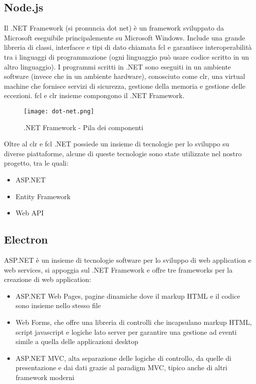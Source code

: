 
\subsection{Node.js}

Il .NET Framework (si pronuncia dot net) è un framework sviluppato da Microsoft eseguibile principalemente su Microsoft Windows.
Include una grande libreria di classi, interfacce e tipi di dato chiamata \Gls{fcl} e garantisce interoperabilità tra i linguaggi di programmazione (ogni linguaggio può usare codice scritto in un altro linguaggio).
I programmi scritti in .NET sono eseguiti in un ambiente software (invece che in un ambiente hardware), conosciuto come \Gls{clr}, una virtual machine che fornisce servizi di sicurezza, gestione della memoria e gestione delle eccezioni.
\Gls{fcl} e \Gls{clr} insieme compongono il .NET Framework.

\begin{figure}[H]
    \centering
    \texttt{[image: dot-net.png]}
    \caption{.NET Framework - Pila dei componenti}
    \label{fig:DotNet}
\end{figure}

Oltre al \Gls{clr} e \Gls{fcl} .NET possiede un insieme di tecnologie per lo sviluppo su diverse piattaforme, alcune di queste tecnologie sono state utilizzate nel nostro progetto, tra le quali:
\begin{itemize}
    \item ASP.NET
    \item Entity Framework
    \item Web API
\end{itemize}


\subsection{Electron}

ASP.NET è un insieme di tecnologie software per lo sviluppo di web application e web services, si appoggia sul .NET Framework e offre tre frameworks per la creazione di web application: 
\begin{itemize}
	\item ASP.NET Web Pages, pagine dinamiche dove il markup HTML e il codice sono insieme nello stesso file
	\item Web Forms, che offre una libreria di controlli che incapsulano markup HTML, script javascript e logiche lato server per garantire una gestione ad eventi simile a quella delle applicazioni desktop
	\item ASP.NET MVC, alta separazione delle logiche di controllo, da quelle di presentazione e dai dati grazie al paradigm MVC, tipico anche di altri framework moderni
\end{itemize}

